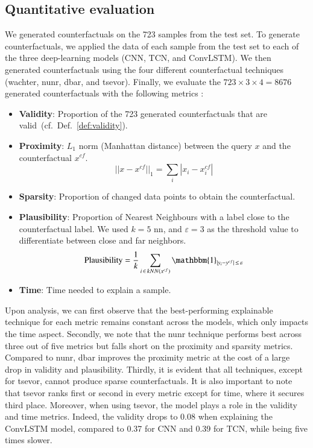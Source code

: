 \subsection{Quantitative evaluation}

We generated counterfactuals on the 723 samples from the test set. To generate counterfactuals, we applied the data of each sample from the test set to each of the three deep-learning models (CNN, TCN, and ConvLSTM). We then generated counterfactuals using the four different counterfactual techniques (\gls{wachter}, \gls{nunr}, \gls{dbar}, and \gls{tsevor}). Finally, we evaluate the $723\times3\times4=8676$ generated counterfactuals with the following metrics :
\begin{itemize}
    \item \textbf{Validity}: Proportion of the 723 generated counterfactuals that are valid~(cf.~Def.~\ref{def:validity}). 
    \item \textbf{Proximity}: $L_1$ norm (Manhattan distance) between the query $x$ and the counterfactual $x^{cf}$.
    \begin{equation}
        ||x - x^{cf}||_1 = \sum_i|x_i - x_i^{cf}|
    \end{equation}
    \item \textbf{Sparsity}: Proportion of changed data points to obtain the counterfactual. 
    \item \textbf{Plausibility}: Proportion of Nearest Neighbours with a label close to the counterfactual label. We used $k=5$ \gls{nn}, and $\varepsilon=3$ as the threshold value to differentiate between close and far neighbors.
    \begin{equation}        \text{Plausibility}=\frac{1}{k}\sum_{i\, \in\, kNN(x^{cf})}\mathbbm{1}_{|y_i - y^{cf}|\, \leq\, \varepsilon}
    \end{equation}
    \item \textbf{Time}: Time needed to explain a sample.
\end{itemize}

Upon analysis, we can first observe that the best-performing explainable technique for each metric remains constant across the models, which only impacts the time aspect. Secondly, we note that the \gls{nunr} technique performs best across three out of five metrics but falls short on the proximity and sparsity metrics. Compared to \gls{nunr}, \gls{dbar} improves the proximity metric at the cost of a large drop in validity and plausibility. Thirdly, it is evident that all techniques, except for \gls{tsevor}, cannot produce sparse counterfactuals. It is also important to note that \gls{tsevor} ranks first or second in every metric except for time, where it secures third place. Moreover, when using \gls{tsevor}, the model plays a role in the validity and time metrics. Indeed, the validity drops to 0.08 when explaining the ConvLSTM model, compared to 0.37 for CNN and 0.39 for TCN, while being five times slower.
